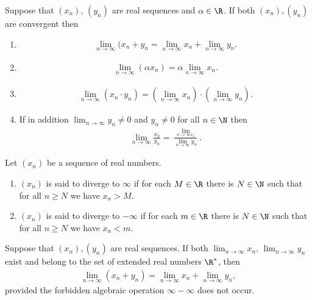 \documentclass{article}
\begin{document}
\begin{theorem}
    Suppose that $(x_n)$, $(y_n)$ are real sequences and $\alpha\in\R$. If both $(x_n), (y_n)$ are
    convergent then
    \begin{enumerate}
        \item \begin{align*}
            \lim_{n\to\infty}(x_n+y_n=\lim_{n\to\infty}x_n + \lim_{n\to\infty}y_n.
        \end{align*}
        \item \begin{align*}
            \lim_{n\to\infty}(\alpha x_n) = \alpha\lim_{n\to\infty}x_n.
        \end{align*}
        \item \begin{align*}
            \lim_{n\to\infty}(x_n\cdot y_n) = \left(\lim_{n\to\infty}x_n\right)\cdot\left(\lim_{n\to\infty}y_n\right).
        \end{align*}
        \item If in addition $\lim_{n\to\infty}y_n\not=0$ and $y_n\not=0$ for all $n\in\N$ then \begin{align*}
            \lim_{n\to\infty}\frac{x_n}{y_n}=\frac{\lim_{n\to\infty x_n}}{\lim_{n\to\infty}y_n}.
        \end{align*}
    \end{enumerate}
\end{theorem}

\setcounter{theorem}{5}
\begin{definition}
    Let $(x_n)$ be a sequence of real numbers.
    \begin{enumerate}
        \item $(x_n)$ is said to diverge to $\infty$ if for each $M\in\R$ there is $N\in\N$ such that
              for all $n\geq N$ we have $x_n>M$.
        \item $(x_n)$ is said to diverge to $-\infty$ if for each $m\in\R$ there is $N\in\N$ such that
              for all $n\geq N$ we have $x_n<m$.
    \end{enumerate}
\end{definition}

\begin{theorem}
    Suppose that $(x_n), (y_n)$ are real sequences. If both $\lim_{n\to\infty}x_n$, $\lim_{n\to\infty}y_n$
    exist and belong to the set of extended real numbers $\R^*$, then
    \begin{align*}
        \lim_{n\to\infty}(x_n+y_n)=\lim_{n\to\infty}x_n+\lim_{n\to\infty}y_n,
    \end{align*}
    provided the forbidden algebraic operation $\infty-\infty$ does not occur.
\end{theorem}
\end{document}
